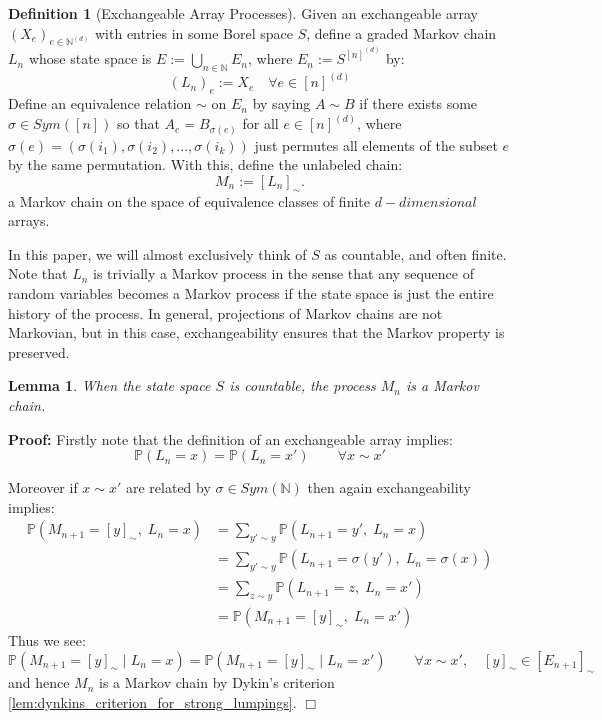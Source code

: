 \documentclass[11pt,oneside,reqno]{article}
\theoremstyle{plain}
\newtheorem{lemma}[theorem]{Lemma}
\theoremstyle{definition}
\newtheorem{definition}[theorem]{Definition}
\numberwithin{equation}{section}
\newcommand{\N}{\mathbb{N}}
\renewcommand{\P}{\mathbb{P}}
\begin{document}
\begin{definition}[Exchangeable Array Processes]
Given an exchangeable array $(X_e)_{e \in \N^{(d)}}$ with entries in some Borel space $S$, define a graded Markov chain $L_n$ whose state space is $E := \bigcup_{n \in \N} E_n$, where $E_n := S^{[n]^{(d)}}$ by:
%
    \[(L_n)_e := X_e\quad \forall e \in [n]^{(d)}\]
%
\noindent Define an equivalence relation $\sim$ on $E_n$ by saying $A \sim B$ if there exists some $\sigma \in Sym([n])$ so that $A_e = B_{\sigma(e)}$ for all $e \in [n]^{(d)}$, where $\sigma(e) = (\sigma(i_1), \sigma(i_2), ..., \sigma(i_k))$ just permutes all elements of the subset $e$ by the same permutation. With this, define the unlabeled chain:
%
\[M_n := [L_n]_\sim.\]
%
\noindent a Markov chain on the space of equivalence classes of finite $d-dimensional$ arrays.
\label{def:exchangeable_array_process}
\end{definition}
%
\noindent In this paper, we will almost exclusively think of $S$ as countable, and often finite. Note that $L_n$ is trivially a Markov process in the sense that any sequence of random variables becomes a Markov process if the state space is just the entire history of the process. In general, projections of Markov chains are not Markovian, but in this case, exchangeability ensures that the Markov property is preserved.

\begin{lemma}
    When the state space $S$ is countable, the process $M_n$ is a Markov chain. 

    \label{lem:index_equivalence}
\end{lemma}
%
\noindent \textbf{Proof: } Firstly note that the definition of an exchangeable array implies:
%
\[\P(L_n = x) = \P(L_n = x') \qquad \forall x \sim x'\]

\noindent Moreover if $x \sim x'$ are related by $\sigma \in Sym(\N)$ then again exchangeability implies:
%
\begin{align*}
    \P(M_{n+1} = [y]_\sim,\; L_n = x) & = \sum_{y' \sim y} \P(L_{n+1} = y', \; L_n = x)\\
    & = \sum_{y' \sim y} \P(L_{n+1} = \sigma(y'), \; L_n = \sigma(x)) \\ 
    & = \sum_{z \sim y} \P(L_{n+1} = z, \; L_n = x') \\
    & = \P(M_{n+1} = [y]_\sim,\; L_n = x')
\end{align*}
%
\noindent Thus we see:
%
\[\P(M_{n+1} = [y]_\sim \; | \; L_n = x) = \P(M_{n+1} = [y]_\sim \; | \; L_n = x') \qquad \forall x \sim x', \quad [y]_\sim \in [E_{n+1}]_\sim\]
%
\noindent and hence $M_n$ is a Markov chain by Dykin's criterion \ref{lem:dynkins_criterion_for_strong_lumpings}. $\Box$\\
\end{document}
